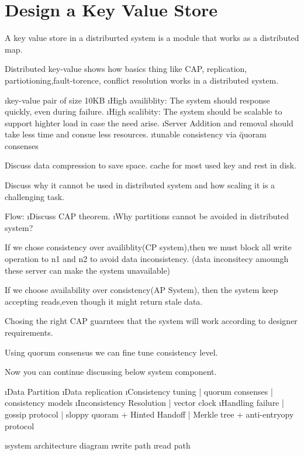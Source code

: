 \chapter{Design a Key Value Store}

A key value store in a distriburted system is a module that works as a distributed map.

Distributed key-value shows how basics thing like CAP, replication, partiotioning,fault-torence, conflict resolution works in a distributed system.

\lstart
    \i key-value pair of size 10KB
    \i High availiblity: The system should response quickly, even during failure.
    \i High scalibity: The system should be scalable to support highter load in case the need arise.
    \i Server Addition and removal should take less time and consue less resources.
    \i tunable consistency via \u{quoram consenses}
\lend


Discuss data compression to save space. cache for most used key and rest in disk.

Discuss why it cannot be used in distributed system and how scaling it is a challenging task.


Flow:
\lstart
    \i Discuss CAP theorem.
    \i Why partitions cannot be avoided in distributed system?
    
    If we chose consistency over availiblity(CP system),then we must block all write operation to n1 and n2 to avoid data inconsistency. (data inconsitecy amoungh these server can make the system unavailable)

    If we choose availability over consistency(AP System), then the system keep accepting reads,even though it might return stale data.

    Chosing the right CAP guarntees that the system will work according to designer requirements.

    Using quorum consensus we can fine tune consistency level.

    \vspace{0.7cm}
    Now you can continue discussing below system component.

    \i Data Partition 
    \i Data replication
    \i Consistency tuning | quorum consenses | consistency models
    \i Inconsistency Resolution | vector clock
    \i Handling failure | gossip protocol | sloppy quoram + Hinted Handoff | Merkle tree + anti-entryopy protocol 
    
    \vspace{0.5cm}
    \i system architecture diagram
    \i write path
    \i read path


\lend


